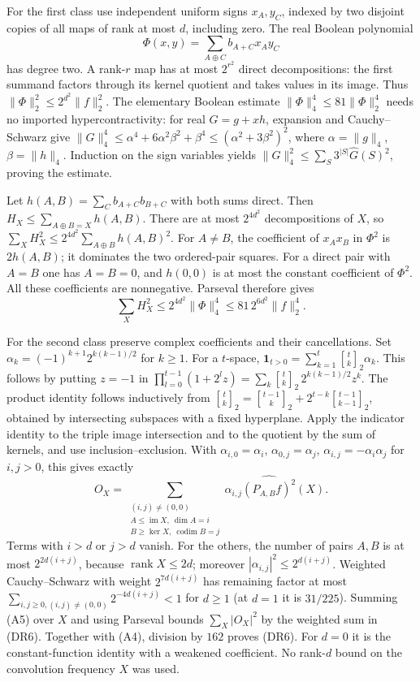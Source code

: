 For the first class use independent uniform signs $x_A,y_C$, indexed by
two disjoint copies of all maps of rank at most $d$, including zero.
The real Boolean polynomial
\[
 \Phi(x,y)=\sum_{A\oplus C} b_{A+C}x_Ay_C
\]
has degree two. A rank-$r$ map has at most $2^{r^2}$ direct
decompositions: the first summand factors through its kernel quotient
and takes values in its image. Thus
$\|\Phi\|_2^2\le2^{d^2}\|f\|_2^2$.
The elementary Boolean estimate $\|\Phi\|_4^4\le81\|\Phi\|_2^4$
needs no imported hypercontractivity: for real $G=g+xh$, expansion and
Cauchy--Schwarz give
$\|G\|_4^4\le\alpha^4+6\alpha^2\beta^2+\beta^4
\le(\alpha^2+3\beta^2)^2$, where
$\alpha=\|g\|_4$, $\beta=\|h\|_4$.
Induction on the sign variables yields
$\|G\|_4^2\le\sum_S3^{|S|}\widehat G(S)^2$, proving the estimate.

Let $h(A,B)=\sum_C b_{A+C}b_{B+C}$ with both sums direct.
Then $H_X\le\sum_{A\oplus B=X}h(A,B)$. There are at most
$2^{4d^2}$ decompositions of $X$, so
$\sum_XH_X^2\le2^{4d^2}\sum_{A\oplus B}h(A,B)^2$.
For $A\ne B$, the coefficient of $x_Ax_B$ in $\Phi^2$ is
$2h(A,B)$; it dominates the two ordered-pair squares. For a direct pair
with $A=B$ one has $A=B=0$, and $h(0,0)$ is at most the constant
coefficient of $\Phi^2$. All these coefficients are nonnegative.
Parseval therefore gives
\[
 \sum_XH_X^2\le2^{4d^2}\|\Phi\|_4^4
                    \le81\,2^{6d^2}\|f\|_2^4.       \tag{A4}
\]

For the second class preserve complex coefficients and their
cancellations. Set $\alpha_k=(-1)^{k+1}2^{k(k-1)/2}$ for $k\ge1$.
For a $t$-space,
$\mathbf1_{t>0}=\sum_{k=1}^t\genfrac{[}{]}{0pt}{}{t}{k}_2\alpha_k$.
This follows by putting $z=-1$ in
$\prod_{l=0}^{t-1}(1+2^lz)
=\sum_k\genfrac{[}{]}{0pt}{}{t}{k}_2\,2^{k(k-1)/2}z^k$.
The product identity follows inductively from
$\genfrac{[}{]}{0pt}{}{t}{k}_2=\genfrac{[}{]}{0pt}{}{t-1}{k}_2+2^{t-k}\genfrac{[}{]}{0pt}{}{t-1}{k-1}_2$,
obtained by intersecting subspaces with a fixed hyperplane.
Apply the indicator identity to the triple image intersection and to
the quotient by the sum of kernels, and use inclusion--exclusion.
With $\alpha_{i,0}=\alpha_i$, $\alpha_{0,j}=\alpha_j$,
$\alpha_{i,j}=-\alpha_i\alpha_j$ for $i,j>0$, this gives exactly
\[
 O_X=\sum_{\substack{(i,j)\ne(0,0)\\
 A\le\operatorname{im}X,\ \dim A=i\\
 B\ge\ker X,\ \operatorname{codim}B=j}}
       \alpha_{i,j}\widehat{(P_{A,B}f)^2}(X).         \tag{A5}
\]
Terms with $i>d$ or $j>d$ vanish. For the others, the number of pairs
$A,B$ is at most $2^{2d(i+j)}$, because $\operatorname{rank}X\le2d$;
moreover $|\alpha_{i,j}|^2\le2^{d(i+j)}$.
Weighted Cauchy--Schwarz with weight $2^{7d(i+j)}$ has remaining factor
at most
$\sum_{i,j\ge0,(i,j)\ne(0,0)}2^{-4d(i+j)}<1$ for $d\ge1$
(at $d=1$ it is $31/225$).
Summing (A5) over $X$ and using Parseval bounds
$\sum_X|O_X|^2$ by the weighted sum in (DR6).
Together with (A4), division by $162$ proves (DR6).
For $d=0$ it is the constant-function identity with a weakened
coefficient. No rank-$d$ bound on the convolution frequency $X$ was used.

